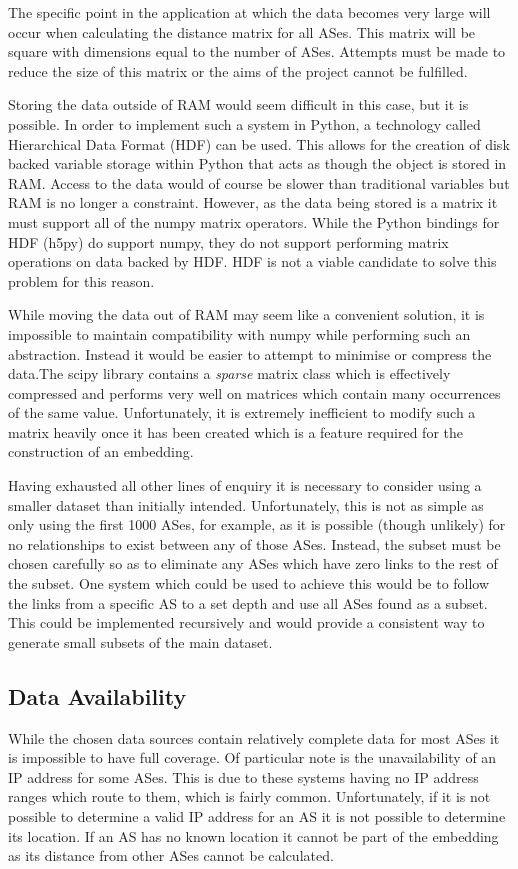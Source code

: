 The specific point in the application at which the data becomes very large will occur when calculating the distance matrix for all ASes. This matrix will be square with dimensions equal to the number of ASes. Attempts must be made to reduce the size of this matrix or the aims of the project cannot be fulfilled.

Storing the data outside of RAM would seem difficult in this case, but it is possible. In order to implement such a system in Python, a technology called Hierarchical Data Format (HDF) can be used. This allows for the creation of disk backed variable storage within Python that acts as though the object is stored in RAM. Access to the data would of course be slower than traditional variables but RAM is no longer a constraint. However, as the data being stored is a matrix it must support all of the numpy matrix operators. While the Python bindings for HDF (h5py) do support numpy, they do not support performing matrix operations on data backed by HDF. HDF is not a viable candidate to solve this problem for this reason.

While moving the data out of RAM may seem like a convenient solution, it is impossible to maintain compatibility with numpy while performing such an abstraction. Instead it would be easier to attempt to minimise or compress the data.The scipy library contains a \textit{sparse} matrix class which is effectively compressed and performs very well on matrices which contain many occurrences of the same value. Unfortunately, it is extremely inefficient to modify such a matrix heavily once it has been created which is a feature required for the construction of an embedding. 

Having exhausted all other lines of enquiry it is necessary to consider using a smaller dataset than initially intended. Unfortunately, this is not as simple as only using the first 1000 ASes, for example, as it is possible (though unlikely) for no relationships to exist between any of those ASes. Instead, the subset must be chosen carefully so as to eliminate any ASes which have zero links to the rest of the subset. One system which could be used to achieve this would be to follow the links from a specific AS to a set depth and use all ASes found as a subset. This could be implemented recursively and would provide a consistent way to generate small subsets of the main dataset.

\subsection{Data Availability}
While the chosen data sources contain relatively complete data for most ASes it is impossible to have full coverage. Of particular note is the unavailability of an IP address for some ASes. This is due to these systems having no IP address ranges which route to them, which is fairly common. Unfortunately, if it is not possible to determine a valid IP address for an AS it is not possible to determine its location. If an AS has no known location it cannot be part of the embedding as its distance from other ASes cannot be calculated. 

